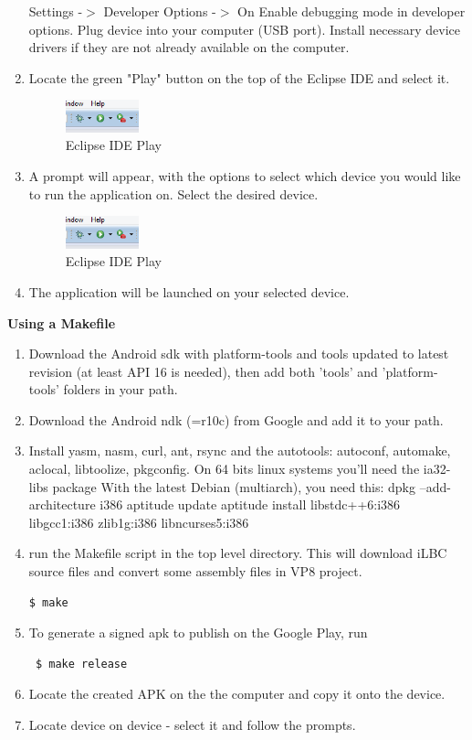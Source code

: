 \documentclass[11pt]{article}
\begin{document}
\begin{enumerate}
\subitem Settings -$>$ Developer Options -$>$ On
\subitem Enable debugging mode in developer options.
\subitem Plug device into your computer (USB port).
\subitem Install necessary device drivers if they are not already available on the computer.
\item Locate the green "Play" button on the top of the Eclipse IDE and select it.
\begin{figure}[H]
\includegraphics[width=80px]{./images/eclipsePlay.png}
\caption{Eclipse IDE Play}
\label{repoClone}
\end{figure}
\item A prompt will appear, with the options to select which device you would like to run the application on. Select the desired device.
\begin{figure}[H]
\includegraphics[width=80px]{./images/eclipsePlay.png}
\caption{Eclipse IDE Play}
\label{repoClone}
\end{figure}
\item The application will be launched on your selected device.
\end{enumerate}

\textbf{Using a Makefile}
\begin{enumerate}
\item Download the Android sdk with platform-tools and tools updated to latest revision (at least API 16 is needed), then add both 'tools' and 'platform-tools' folders in your path.
\item Download the Android ndk (=r10c) from Google and add it to your path.
\item Install yasm, nasm, curl, ant, rsync and the autotools: autoconf, automake, aclocal, libtoolize, pkgconfig.
\subitem On 64 bits linux systems you'll need the ia32-libs package
\subitem With the latest Debian (multiarch), you need this:
\subsubitem dpkg --add-architecture i386
\subsubitem aptitude update
\subsubitem aptitude install libstdc++6:i386 libgcc1:i386 zlib1g:i386 libncurses5:i386
\item run the Makefile script in the top level directory. This will download iLBC source files and convert some assembly files in VP8 project.
\begin{verbatim}$ make \end{verbatim}
\item To generate a signed apk to publish on the Google Play, run  \begin{verbatim} $ make release \end{verbatim}
\item Locate the created APK on the the computer and copy it onto the device. 
\item Locate device on device - select it and follow the prompts.
\end{enumerate}
\end{document}

